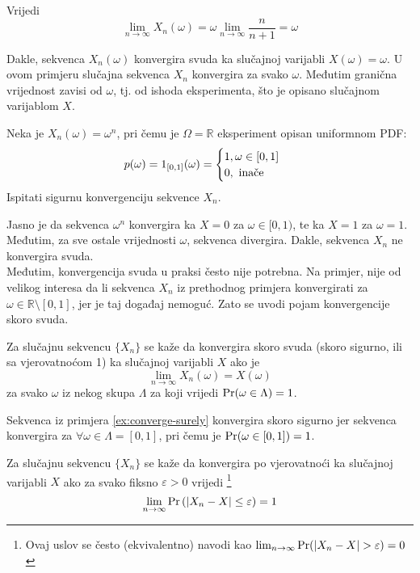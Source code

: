 Vrijedi
\begin{equation}
  \lim_{n\to\infty} X_n(\omega) = \omega \lim_{n\to\infty}\frac{n}{n+1} = \omega
\end{equation}

Dakle, sekvenca $X_n(\omega)$ konvergira svuda ka slučajnoj varijabli $X(\omega)
= \omega$. U ovom primjeru slučajna sekvenca $X_n$ konvergira za svako $\omega$.
Međutim granična vrijednost zavisi od $\omega$, tj. od ishoda eksperimenta, što
je opisano slučajnom varijablom $X$.

\begin{exmp} \label{ex:converge-surely}
  Neka je $X_n(\omega) = \omega^n$, pri čemu je $\Omega= \mathbb{R}$ eksperiment
  opisan uniformnom PDF:
  $$p(\omega) = 1_{[0,1]}(\omega) = \begin{cases}
      1, \omega \in [0,1]\ \\ 0,\ \text{\normalfont inače}
    \end{cases}
  $$
  Ispitati sigurnu konvergenciju sekvence $X_n$.
\end{exmp}
Jasno je da sekvenca $\omega^n$ konvergira ka $X=0$ za $\omega \in [0,1)$, te ka
$X=1$ za $\omega = 1$. Međutim, za sve ostale vrijednosti $\omega$, sekvenca
divergira. Dakle, sekvenca $X_n$ ne konvergira svuda.\\

Međutim, konvergencija svuda u praksi često nije potrebna. Na primjer, nije od
velikog interesa da li sekvenca $X_n$ iz prethodnog primjera konvergirati za
$\omega \in \mathbb{R}\setminus[0,1]$, jer je taj događaj nemoguć. Zato se uvodi
pojam konvergencije skoro svuda.

\begin{definition}
  Za slučajnu sekvencu $\{X_n\}$ se kaže da konvergira skoro svuda (skoro
  sigurno, ili sa vjerovatnoćom 1) ka slučajnoj varijabli $X$ ako je
  \begin{equation}
    \lim_{n\to\infty} X_n(\omega) = X(\omega)
  \end{equation}
  za svako $\omega$ iz nekog skupa $\Lambda$ za koji vrijedi
  $\mathrm{Pr}(\omega\in\Lambda)=1$.
\end{definition}

Sekvenca iz primjera \ref{ex:converge-surely} konvergira skoro sigurno jer
sekvenca konvergira za $\forall \omega \in \Lambda = [0,1]$, pri čemu je
$\mathrm{Pr}(\omega \in [0,1]) = 1$.

\begin{definition}
  Za slučajnu sekvencu $\{X_n\}$ se kaže da konvergira po vjerovatnoći ka
  slučajnoj varijabli $X$ ako za svako fiksno $\varepsilon > 0$ vrijedi
  \footnote{
    Ovaj uslov se često (ekvivalentno) navodi kao
    $\lim_{n\to\infty} \pr(|X_n-X|>\varepsilon) = 0$
  }
  \begin{equation}
    \lim_{n\to\infty} \mathrm{Pr}\left(|X_n - X| \le \varepsilon\right) = 1
  \end{equation}
\end{definition}

